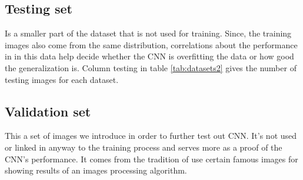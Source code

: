 \subsection{Testing set}
Is a smaller part of the dataset that is not used for training. Since, the training images also come from the same distribution, correlations about the performance in in this data help decide whether the CNN is overfitting the data or how good the generalization is. Column testing in table \ref{tab:datasets2}  gives the number of testing images for each dataset. 

\subsection{Validation set}
This a set of images we introduce in order to further test out CNN. It's not used or linked in anyway to the training process and serves more as a proof of the CNN's performance. It comes from the tradition of use certain famous images for showing results of an images processing algorithm.



